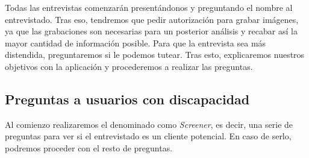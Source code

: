 Todas las entrevistas comenzarán presentándonos y preguntando el nombre al entrevistado. Tras eso, tendremos que pedir autorización para grabar imágenes, ya que las
grabaciones son necesarias para un posterior análisis y recabar así la mayor cantidad de información posible. Para que la entrevista sea más distendida, preguntaremos
si le podemos tutear. Tras esto, explicaremos nuestros objetivos con la aplicación y procederemos a realizar las preguntas.

\subsection{Preguntas a usuarios con discapacidad}

Al comienzo realizaremos el denominado como \textit{Screener}, es decir, una serie de preguntas para ver si el entrevistado es un cliente potencial. En caso de serlo,
podremos proceder con el resto de preguntas.

